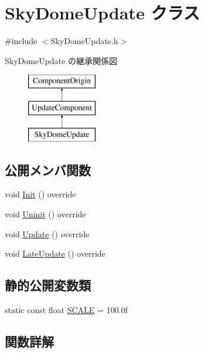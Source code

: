 \hypertarget{class_sky_dome_update}{}\section{Sky\+Dome\+Update クラス}
\label{class_sky_dome_update}


{\ttfamily \#include $<$Sky\+Dome\+Update.\+h$>$}

Sky\+Dome\+Update の継承関係図\begin{figure}[H]
\begin{center}
\leavevmode
\includegraphics[height=3.000000cm]{class_sky_dome_update}
\end{center}
\end{figure}
\subsection*{公開メンバ関数}
\begin{DoxyCompactItemize}
\item 
void \mbox{\hyperlink{class_sky_dome_update_ab4fec6d13590c07e39e6e8b4f7f7613a}{Init}} () override
\item 
void \mbox{\hyperlink{class_sky_dome_update_a54da74ef017a22075ce473abe1345489}{Uninit}} () override
\item 
void \mbox{\hyperlink{class_sky_dome_update_ae163cb90e4de561fe1f7b2cb311be331}{Update}} () override
\item 
void \mbox{\hyperlink{class_sky_dome_update_a94347cb50b4dc13528738a7b812da261}{Late\+Update}} () override
\end{DoxyCompactItemize}
\subsection*{静的公開変数類}
\begin{DoxyCompactItemize}
\item 
static const float \mbox{\hyperlink{class_sky_dome_update_a4c6750a54880db753cfe2a4ecfd24130}{S\+C\+A\+LE}} = 100.\+0f
\end{DoxyCompactItemize}


\subsection{関数詳解}
\mbox{\label{class_sky_dome_update_ab4fec6d13590c07e39e6e8b4f7f7613a}} 
